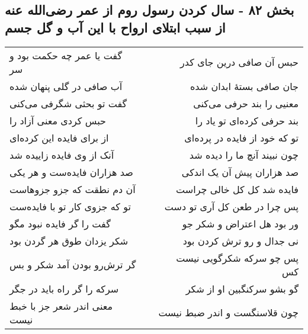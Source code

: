 \begin{center}
\section*{بخش ۸۲ - سال کردن رسول روم از عمر رضی‌الله عنه از سبب ابتلای ارواح با این آب و گل جسم}
\label{sec:sh082}
\begin{longtable}{l p{0.5cm} r}
گفت یا عمر چه حکمت بود و سر
&&
حبس آن صافی درین جای کدر
\\
آب صافی در گلی پنهان شده
&&
جان صافی بستهٔ ابدان شده
\\
گفت تو بحثی شگرفی می‌کنی
&&
معنیی را بند حرفی می‌کنی
\\
حبس کردی معنی آزاد را
&&
بند حرفی کرده‌ای تو یاد را
\\
از برای فایده این کرده‌ای
&&
تو که خود از فایده در پرده‌ای
\\
آنک از وی فایده زاییده شد
&&
چون نبیند آنچ ما را دیده شد
\\
صد هزاران فایده‌ست و هر یکی
&&
صد هزاران پیش آن یک اندکی
\\
آن دم نطقت که جزو جزوهاست
&&
فایده شد کل کل خالی چراست
\\
تو که جزوی کار تو با فایده‌ست
&&
پس چرا در طعن کل آری تو دست
\\
گفت را گر فایده نبود مگو
&&
ور بود هل اعتراض و شکر جو
\\
شکر یزدان طوق هر گردن بود
&&
نی جدال و رو ترش کردن بود
\\
گر ترش‌رو بودن آمد شکر و بس
&&
پس چو سرکه شکرگویی نیست کس
\\
سرکه را گر راه باید در جگر
&&
گو بشو سرکنگبین او از شکر
\\
معنی اندر شعر جز با خبط نیست
&&
چون قلاسنگست و اندر ضبط نیست
\\
\end{longtable}
\end{center}
